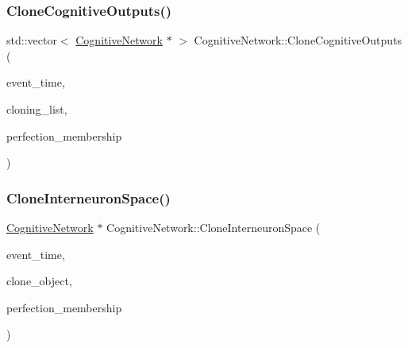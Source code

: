 \subsubsection{\texorpdfstring{Clone\+Cognitive\+Outputs()}{CloneCognitiveOutputs()}}
{\footnotesize\ttfamily std\+::vector$<$ \mbox{\hyperlink{classCognitiveNetwork}{Cognitive\+Network}} $\ast$ $>$ Cognitive\+Network\+::\+Clone\+Cognitive\+Outputs (\begin{DoxyParamCaption}\item[{std\+::chrono\+::time\+\_\+point$<$ \mbox{\hyperlink{universe_8h_a0ef8d951d1ca5ab3cfaf7ab4c7a6fd80}{Clock}} $>$}]{event\+\_\+time,  }\item[{std\+::vector$<$ \mbox{\hyperlink{classCognitiveNetwork}{Cognitive\+Network}} $\ast$$>$}]{cloning\+\_\+list,  }\item[{double}]{perfection\+\_\+membership }\end{DoxyParamCaption})}

\mbox{\label{classCognitiveNetwork_a1eef76439fffb9daaa3edc4e3c012831}} 
\subsubsection{\texorpdfstring{Clone\+Interneuron\+Space()}{CloneInterneuronSpace()}}
{\footnotesize\ttfamily \mbox{\hyperlink{classCognitiveNetwork}{Cognitive\+Network}} $\ast$ Cognitive\+Network\+::\+Clone\+Interneuron\+Space (\begin{DoxyParamCaption}\item[{std\+::chrono\+::time\+\_\+point$<$ \mbox{\hyperlink{universe_8h_a0ef8d951d1ca5ab3cfaf7ab4c7a6fd80}{Clock}} $>$}]{event\+\_\+time,  }\item[{\mbox{\hyperlink{classCognitiveNetwork}{Cognitive\+Network}} $\ast$}]{clone\+\_\+object,  }\item[{double}]{perfection\+\_\+membership }\end{DoxyParamCaption})}

\mbox{\label{classCognitiveNetwork_a5ee1d7b6df5bfe0048b4aea317c1974c}} 
